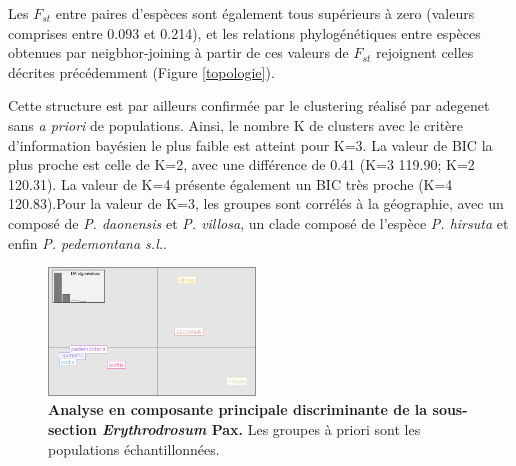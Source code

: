 Les $F_{st}$ entre paires d'espèces sont également tous supérieurs à zero (valeurs comprises entre 0.093 et 0.214), et les relations phylogénétiques entre espèces obtenues par neigbhor-joining à partir de ces valeurs de $F_{st}$ rejoignent celles décrites précédemment (Figure \ref{topologie}).

Cette structure est par ailleurs confirmée par le clustering réalisé par adegenet sans \textit{a priori} de populations. Ainsi, le nombre K de clusters avec le critère d'information bayésien le plus faible est atteint pour K=3. La valeur de BIC la plus proche est celle de K=2, avec une différence de 0.41 (K=3 119.90; K=2 120.31). La valeur de K=4 présente également un BIC très proche (K=4 120.83).Pour la valeur de K=3, les groupes sont corrélés à la géographie, avec un  composé de \textit{P. daonensis} et \textit{P. villosa}, un clade composé de l'espèce \textit{P. hirsuta} et enfin \textit{P. pedemontana s.l.}.

\begin{figure}
	\vspace{-20pt}
	\begin{center}
    \includegraphics[width=0.49\textwidth]{fig/DAPC.png}
    \caption{\textbf{Analyse en composante principale discriminante de la sous-section \textit{Erythrodrosum} Pax.} Les groupes à priori sont les populations échantillonnées.}
    \end{center}
    \label{DAPC}
    \vspace{-20pt}
\end{figure}

